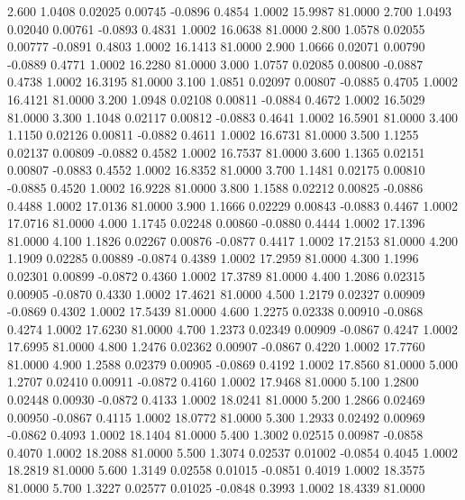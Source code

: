    2.600   1.0408   0.02025   0.00745  -0.0896   0.4854   1.0002  15.9987  81.0000
   2.700   1.0493   0.02040   0.00761  -0.0893   0.4831   1.0002  16.0638  81.0000
   2.800   1.0578   0.02055   0.00777  -0.0891   0.4803   1.0002  16.1413  81.0000
   2.900   1.0666   0.02071   0.00790  -0.0889   0.4771   1.0002  16.2280  81.0000
   3.000   1.0757   0.02085   0.00800  -0.0887   0.4738   1.0002  16.3195  81.0000
   3.100   1.0851   0.02097   0.00807  -0.0885   0.4705   1.0002  16.4121  81.0000
   3.200   1.0948   0.02108   0.00811  -0.0884   0.4672   1.0002  16.5029  81.0000
   3.300   1.1048   0.02117   0.00812  -0.0883   0.4641   1.0002  16.5901  81.0000
   3.400   1.1150   0.02126   0.00811  -0.0882   0.4611   1.0002  16.6731  81.0000
   3.500   1.1255   0.02137   0.00809  -0.0882   0.4582   1.0002  16.7537  81.0000
   3.600   1.1365   0.02151   0.00807  -0.0883   0.4552   1.0002  16.8352  81.0000
   3.700   1.1481   0.02175   0.00810  -0.0885   0.4520   1.0002  16.9228  81.0000
   3.800   1.1588   0.02212   0.00825  -0.0886   0.4488   1.0002  17.0136  81.0000
   3.900   1.1666   0.02229   0.00843  -0.0883   0.4467   1.0002  17.0716  81.0000
   4.000   1.1745   0.02248   0.00860  -0.0880   0.4444   1.0002  17.1396  81.0000
   4.100   1.1826   0.02267   0.00876  -0.0877   0.4417   1.0002  17.2153  81.0000
   4.200   1.1909   0.02285   0.00889  -0.0874   0.4389   1.0002  17.2959  81.0000
   4.300   1.1996   0.02301   0.00899  -0.0872   0.4360   1.0002  17.3789  81.0000
   4.400   1.2086   0.02315   0.00905  -0.0870   0.4330   1.0002  17.4621  81.0000
   4.500   1.2179   0.02327   0.00909  -0.0869   0.4302   1.0002  17.5439  81.0000
   4.600   1.2275   0.02338   0.00910  -0.0868   0.4274   1.0002  17.6230  81.0000
   4.700   1.2373   0.02349   0.00909  -0.0867   0.4247   1.0002  17.6995  81.0000
   4.800   1.2476   0.02362   0.00907  -0.0867   0.4220   1.0002  17.7760  81.0000
   4.900   1.2588   0.02379   0.00905  -0.0869   0.4192   1.0002  17.8560  81.0000
   5.000   1.2707   0.02410   0.00911  -0.0872   0.4160   1.0002  17.9468  81.0000
   5.100   1.2800   0.02448   0.00930  -0.0872   0.4133   1.0002  18.0241  81.0000
   5.200   1.2866   0.02469   0.00950  -0.0867   0.4115   1.0002  18.0772  81.0000
   5.300   1.2933   0.02492   0.00969  -0.0862   0.4093   1.0002  18.1404  81.0000
   5.400   1.3002   0.02515   0.00987  -0.0858   0.4070   1.0002  18.2088  81.0000
   5.500   1.3074   0.02537   0.01002  -0.0854   0.4045   1.0002  18.2819  81.0000
   5.600   1.3149   0.02558   0.01015  -0.0851   0.4019   1.0002  18.3575  81.0000
   5.700   1.3227   0.02577   0.01025  -0.0848   0.3993   1.0002  18.4339  81.0000
